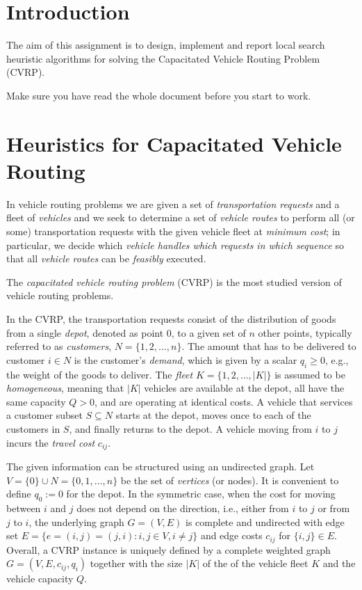 

\section*{Introduction}

The aim of this assignment is to design, implement and report local
search heuristic algorithms for solving the Capacitated Vehicle Routing
Problem (CVRP).



\medskip
Make sure you have read the whole document before you start to work.


\section*{Heuristics for Capacitated Vehicle Routing}

In vehicle routing problems we are given a set of \emph{transportation
  requests} and a fleet of \emph{vehicles} and we seek to determine a
set of \emph{vehicle routes} to perform all (or some) transportation
requests with the given vehicle fleet at \emph{minimum cost}; in
particular, we decide which \emph{vehicle handles which requests in which
  sequence} so that all \emph{vehicle routes} can be \emph{feasibly}
executed.

The \emph{capacitated vehicle routing problem} (CVRP) is the most studied
version of vehicle routing problems.

In the CVRP, the transportation requests consist of the distribution of
goods from a single \emph{depot}, denoted as point $0$, to a given set
of $n$ other points, typically referred to as \emph{customers},
$N=\{1,2,\ldots,n\}$. The amount that has to be delivered to customer
$i\in N$ is the customer's \emph{demand}, which is given by a scalar
$q_i\geq 0 $, e.g., the weight of the goods to deliver. The \emph{fleet}
$K=\{1,2,\ldots,|K|\}$ is assumed to be \emph{homogeneous}, meaning that
$|K|$ vehicles are available at the depot, all have the same capacity
$Q>0$, and are operating at identical costs. A vehicle that services a
customer subset $S\subseteq N$ starts at the depot, moves once to each
of the customers in $S$, and finally returns to the depot. A vehicle
moving from $i$ to $j$ incurs the \emph{travel cost} $c_{ij}$.

The given information can be structured using an undirected graph. Let
$V=\{0\}\cup N=\{0,1,\ldots,n\}$ be the set of \emph{vertices} (or
nodes). It is convenient to define $q_0:=0$ for the depot. In the
symmetric case, when the cost
for moving between $i$ and $j$ does not depend on the direction, i.e.,
either from $i$ to $j$ or from $j$ to $i$, the underlying graph
$G=(V,E)$ is complete and undirected with edge set $E=\{e=(i,j)=(j,i) :
i,j\in V,i\neq j\}$ and edge costs $c_{ij}$ for $\{i,j\} \in E$.
Overall, a CVRP instance is uniquely defined by a complete weighted graph
$G=(V,E,c_{ij},q_i)$ together with the size $|K|$ of the of the vehicle
fleet $K$ and the vehicle capacity $Q$.

